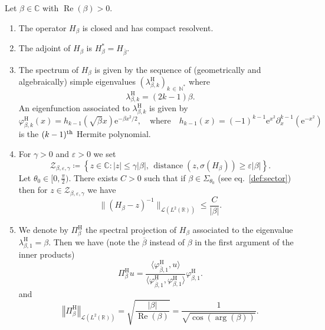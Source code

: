 \documentclass[10pt]{amsart}
\theoremstyle{definition}\newtheorem{defi}[theo]{Definition}\newtheorem{rema}[theo]{Remark}\newtheorem{exam}[theo]{Example}\newtheorem{exem}[theo]{Example}\newtheorem{nota}[theo]{Notation}
\newcommand{\abs}[1]{\left\vert #1\right\vert}
\newcommand{\nr}[1]{\left\Vert #1\right\Vert}
\renewcommand{\leq}{\leqslant}
\renewcommand{\geq}{\geqslant}
\newcommand{\inv}{^{-1}}
\newcommand{\1}{\mathds 1}
\DeclareMathOperator{\Ree}{Re}
\DeclareMathOperator{\distance}{distance}
\newcommand{\R}{\mathbb{R}}
\newcommand{\C}{\mathbb{C}}
\newcommand{\N}{\mathbb{N}}
\newcommand{\Lc}{{\mathcal L}}
\newcommand{\Zc}{\mathcal Z}
\newcommand{\eu}{\mathrm e}
\newcommand{\He}{h}
\newcommand{\sector}[1][\theta_0]{\Sigma_{#1}}
\newcommand{\h}{{\mathrm{H}}}
\renewcommand{\b}{\beta}
\newcommand{\g}{\gamma}
\newcommand{\e}{\varepsilon}
\renewcommand{\th}{\theta}
\renewcommand{\l}{\lambda}
\newcommand{\f}{\varphi}
\newcommand*{\romanenumi}{\renewcommand*{\theenumi}{\roman{enumi}}}
\begin{document}
\break
\begin{prop}\label{prop:Davies}
Let $\b \in \C$ with $\Ree(\b) > 0$.
\begin{enumerate}\romanenumi
\item The operator $H_\b$ is closed and has compact resolvent.


\item The adjoint of $H_\b$ is $H_\b^* = H_{\bar \b}$.

\item The spectrum of $H_\beta$ is given by the sequence of (geometrically and algebraically) simple eigenvalues $(\l_{\b,k}^\h)_{k\,\in\,\N^*}$ where
\[
\l_{\b,k}^\h = (2k-1) \beta.
\]
An eigenfunction associated to $\l_{\b,k}^\h$ is given by
\[
\f_{\b,k}^\h(x) = \He_{k-1}\left(\sqrt \b x\right)\eu^{-\b x^2\!/2}, \quad \text{where} \quad \He_{k-1}(x) = (-1)^{k-1}\eu^{x^2}\partial_x^{k-1}\left(\eu^{-x^2}\right)
\]
is the $(k-1)^{\rm th}$ Hermite polynomial.

\item For $\g > 0$ and $\e > 0$ we set
\begin{equation}\label{def:Zc-beta}
\Zc_{\b,\e,\g} \coloneqq \left\{ z \in \C \colon \abs z \leq \g \abs \beta, \, \distance (z,\sigma(H_\beta)) \geq \e \abs \b\right\}.
\end{equation}
Let $\th_0 \in [0,\frac \pi 2)$. There exists $C > 0$ such that if $\beta \in \sector$ (see eq.~\eqref{def:sector}) then for $z \in \Zc_{\b,\e,\g}$ we have
\begin{equation}\label{eq:res-Hb}
\big\| \left(H_\beta - z\right)\inv \big\|_{\Lc\left(L^2(\R)\right)} \leq \frac C {\abs \beta}.
\end{equation}

\item We denote by $\Pi_{\b}^\h$ the spectral projection of $H_\b$ associated to the eigenvalue $\l_{\b,1}^\h = \b$. Then we have (note the $\overline \beta$ instead of $\beta$ in the first argument of the inner products)
\begin{equation}\label{eq:eigenproj-Hb-formula}
\Pi_\b^\h u = \frac {\big\langle \f_{\bar \b,1}^\h,u \big\rangle} {\big\langle \f_{\bar \b,1}^\h, \f_{\b,1}^\h \big\rangle} \f_{\b,1}^\h.
\end{equation}
and
\begin{equation}\label{eq:eigenproj-Hb}
\nr{\Pi_\b^\h}_{\Lc(L^2(\R))} = \sqrt{\frac {\abs \b}{\Ree(\b)}} = \frac 1 {\sqrt{\cos(\arg(\b))}}.
\end{equation}
\end{enumerate}
\end{prop}
\end{document}
